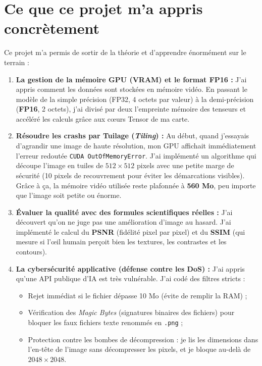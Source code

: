 \documentclass[11pt,a4paper]{article}
\begin{document}
\section{Ce que ce projet m'a appris concrètement}

Ce projet m'a permis de sortir de la théorie et d'apprendre énormément sur le terrain :

\begin{enumerate}[leftmargin=*]
    \item \textbf{La gestion de la mémoire GPU (VRAM) et le format FP16 :}
    J'ai appris comment les données sont stockées en mémoire vidéo. En passant le modèle de la simple précision (FP32, 4 octets par valeur) à la demi-précision (\textbf{FP16}, 2 octets), j'ai divisé par deux l'empreinte mémoire des tenseurs et accéléré les calculs grâce aux cœurs Tensor de ma carte.
    
    \item \textbf{Résoudre les crashs par Tuilage (\textit{Tiling}) :}
    Au début, quand j'essayais d'agrandir une image de haute résolution, mon GPU affichait immédiatement l'erreur redoutée \texttt{CUDA OutOfMemoryError}. J'ai implémenté un algorithme qui découpe l'image en tuiles de $512 \times 512$ pixels avec une petite marge de sécurité (10 pixels de recouvrement pour éviter les démarcations visibles). Grâce à ça, la mémoire vidéo utilisée reste plafonnée à \textbf{560 Mo}, peu importe que l'image soit petite ou énorme.
    
    \item \textbf{Évaluer la qualité avec des formules scientifiques réelles :}
    J'ai découvert qu'on ne juge pas une amélioration d'image au hasard. J'ai implémenté le calcul du \textbf{PSNR} (fidélité pixel par pixel) et du \textbf{SSIM} (qui mesure si l'œil humain perçoit bien les textures, les contrastes et les contours).
    
    \item \textbf{La cybersécurité applicative (défense contre les DoS) :}
    J'ai appris qu'une API publique d'IA est très vulnérable. J'ai codé des filtres stricts :
    \begin{itemize}[noitemsep]
        \item Rejet immédiat si le fichier dépasse 10 Mo (évite de remplir la RAM) ;
        \item Vérification des \textit{Magic Bytes} (signatures binaires des fichiers) pour bloquer les faux fichiers texte renommés en \texttt{.png} ;
        \item Protection contre les bombes de décompression : je lis les dimensions dans l'en-tête de l'image sans décompresser les pixels, et je bloque au-delà de $2048 \times 2048$.
    \end{itemize}


\end{enumerate}
\end{document}

